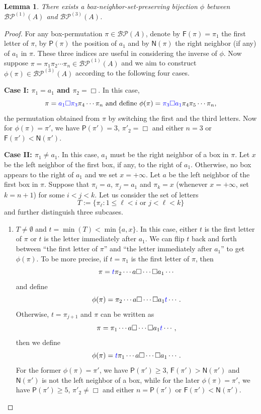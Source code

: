 \documentclass[12pt]{amsart}
\numberwithin{equation}{section}
\def\blue{\textcolor{blue}}
\theoremstyle{plain}
\newtheorem{lemma}[theorem]{Lemma}
\theoremstyle{definition}
\newcommand{\BP}{\mathcal{BP}}
\begin{document}
\begin{lemma}
There exists a box-neighbor-set-preserving bijection $\phi$ between $\BP^{(1)}(A)$ and $\BP^{(3)}(A)$.
\end{lemma}
\begin{proof}
For any box-permutation $\pi\in\BP(A)$, denote by $\mathsf{F}(\pi)=\pi_1$ the first letter of $\pi$, by $\mathsf{P}(\pi)$ the position of $a_1$ and by $\mathsf{N}(\pi)$ the right neighbor (if any) of $a_1$  in $\pi$. These three indices are useful in considering the inverse of $\phi$. 
Now suppose $\pi=\pi_1\pi_2\cdots\pi_n\in\BP^{(1)}(A)$ and we aim to construct $\phi(\pi)\in\BP^{(3)}(A)$ according to the following four cases.

{\bf Case I: $\pi_1=a_1$ and $\pi_2=\Box$}. In this case, 
$$\pi=\blue{a_1\Box\pi_3}\pi_4\cdots\pi_n \text{ and define } \phi(\pi)=\blue{\pi_3\Box a_1}\pi_4\pi_5\cdots\pi_n,
$$ the permutation obtained from $\pi$ by switching the first and the third letters. Now for $\phi(\pi)=\pi'$, we have $\mathsf{P}(\pi')=3$, $\pi'_2=\Box$ and either $n=3$ or $\mathsf{F}(\pi')<\mathsf{N}(\pi')$. 

{\bf Case II: $\pi_1\neq a_1$}. In this case, $a_1$ must be the right neighbor of a box in $\pi$.  Let $x$ be the left neighbor of the first box, if any, to the right of $a_1$. Otherwise, no box appears to the right of $a_1$ and we set $x=+\infty$.  Let $a$ be the left neighbor of the first box in $\pi$. Suppose that $\pi_i=a$, $\pi_j=a_1$ and $\pi_k=x$ (whenever $x=+\infty$, set $k=n+1$) for some $i<j<k$. 
Let us consider the set of letters 
$$
T:=\{\pi_{\ell}: 1\leq \ell<i\text{ or }j<\ell<k\}
$$
and further   distinguish three subcases.
\begin{enumerate}
\item $T\neq\emptyset$ and $t=\min(T)<\min\{a,x\}$. In this case, either $t$ is the first letter of $\pi$ or $t$ is the letter immediately after $a_1$. We can flip $t$ back and forth between ``the first letter of $\pi$'' and ``the letter immediately after $a_1$'' to get $\phi(\pi)$. To be more precise, if $t=\pi_1$ is the first letter of $\pi$, then 
$$
\pi=\blue{t}\pi_2\cdots a\Box\cdots\Box a_1\cdots
$$
and define 
$$
\phi(\pi)=\pi_2\cdots a\Box\cdots\Box a_1\blue{t}\cdots.
$$
Otherwise, $t=\pi_{j+1}$ and $\pi$ can be written as 
$$
\pi=\pi_1\cdots a\Box\cdots\Box a_1\blue{t}\cdots,
$$
then we define 
$$
\phi(\pi)=\blue{t}\pi_1\cdots a\Box\cdots\Box a_1\cdots.
$$
For  the former $\phi(\pi)=\pi'$, we have $\mathsf{P}(\pi')\geq3$, $\mathsf{F}(\pi')>\mathsf{N}(\pi')$ and $\mathsf{N}(\pi')$ is not the left neighbor of a box, while for the later $\phi(\pi)=\pi'$, we have $\mathsf{P}(\pi')\geq5$, $\pi'_2\neq\Box$ and either $n=\mathsf{P}(\pi')$ or $\mathsf{F}(\pi')<\mathsf{N}(\pi')$. 


\end{enumerate}
\end{proof}
\end{document}
